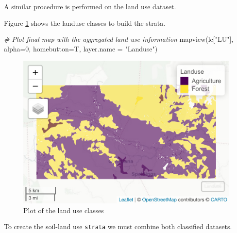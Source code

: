 \documentclass[
]{book}
\newenvironment{Shaded}{\begin{snugshade}}{\end{snugshade}}
\newcommand{\AttributeTok}[1]{\textcolor[rgb]{0.77,0.63,0.00}{#1}}
\newcommand{\CommentTok}[1]{\textcolor[rgb]{0.56,0.35,0.01}{\textit{#1}}}
\newcommand{\DecValTok}[1]{\textcolor[rgb]{0.00,0.00,0.81}{#1}}
\newcommand{\FunctionTok}[1]{\textcolor[rgb]{0.00,0.00,0.00}{#1}}
\newcommand{\NormalTok}[1]{#1}
\newcommand{\OtherTok}[1]{\textcolor[rgb]{0.56,0.35,0.01}{#1}}
\newcommand{\SpecialCharTok}[1]{\textcolor[rgb]{0.00,0.00,0.00}{#1}}
\newcommand{\StringTok}[1]{\textcolor[rgb]{0.31,0.60,0.02}{#1}}
\begin{document}
A similar procedure is performed on the land use dataset.

Figure \ref{fig:fig-9b} shows the landuse classes to build the strata.

\begin{Shaded}
\begin{Highlighting}[]
  \CommentTok{\# Plot final map with the aggregated land use information}
  \FunctionTok{mapview}\NormalTok{(lc[}\StringTok{"LU"}\NormalTok{], }\AttributeTok{alpha=}\DecValTok{0}\NormalTok{, }\AttributeTok{homebutton=}\NormalTok{T, }\AttributeTok{layer.name =} \StringTok{"Landuse"}\NormalTok{)}
\end{Highlighting}
\end{Shaded}

\begin{figure}
\centering
\includegraphics{Technical-Manual-Soil-Sampling-Design_files/figure-latex/fig-9b-1.pdf}
\caption{\label{fig:fig-9b}Plot of the land use classes}
\end{figure}

To create the soil-land use \texttt{strata} we must combine both classified datasets.

\begin{Shaded}
\end{Shaded}
\end{document}

